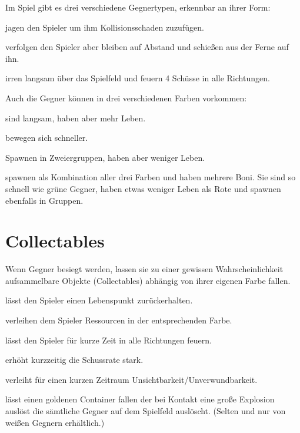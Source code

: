 \documentclass[a4paper,10pt,ngerman,fontsize=12pt]{scrreprt}
\begin{document}
Im Spiel gibt es drei verschiedene Gegnertypen, erkennbar an ihrer Form:

\renewcommand{\itmspace}{4.5em}
{jagen den Spieler um ihm Kollisionsschaden zuzufügen.}

{verfolgen den Spieler aber bleiben auf Abstand und schie{\ss}en aus der Ferne auf ihn.}

{irren langsam über das Spielfeld und feuern 4 Schüsse in alle Richtungen.}

Auch die Gegner können in drei verschiedenen Farben vorkommen:

\renewcommand{\itmspace}{7.5em}
{sind langsam, haben aber mehr Leben.}

{bewegen sich schneller.}

{Spawnen in Zweiergruppen, haben aber weniger Leben.}

{spawnen als Kombination aller drei Farben und haben mehrere Boni. Sie sind so schnell wie grüne Gegner, haben etwas weniger Leben als Rote und spawnen ebenfalls in Gruppen.}




\section{Collectables}

Wenn Gegner besiegt werden, lassen sie zu einer gewissen Wahrscheinlichkeit aufsammelbare Objekte (Collectables) abhängig von ihrer eigenen Farbe fallen.

\renewcommand{\itmspace}{5.5em}
{lässt den Spieler einen Lebenspunkt zurückerhalten.}

{verleihen dem Spieler Ressourcen in der entsprechenden Farbe.}

{lässt den Spieler für kurze Zeit in alle Richtungen feuern.}

{erhöht kurzzeitig die Schussrate stark.}

{verleiht für einen kurzen Zeitraum Unsichtbarkeit/Unverwundbarkeit.}

{lässt einen goldenen Container fallen der bei Kontakt eine gro{\ss}e Explosion auslöst die sämtliche Gegner auf dem Spielfeld auslöscht. (Selten und nur von wei{\ss}en Gegnern erhältlich.)}
\end{document}
